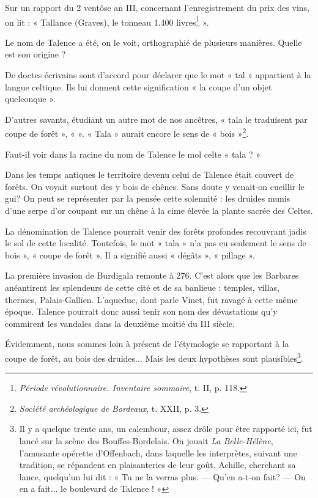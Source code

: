 Sur un rapport du 2 ventôse an III, concernant l'enregistrement du prix des vins, on lit : « Tallance (Graves), le tonneau 1.400 livres\footnote{\textit{Période révolutionnaire. Inventaire sommaire}, t. II, p. 118.} ».

Le nom de Talence a été, on le voit, orthographié de plusieurs manières. Quelle est son origine ?

De doctes écrivains sont d'accord pour déclarer que le mot « tal » appartient à la langue celtique. Ils lui donnent cette signification « la coupe d'un objet quelconque ».

D'autres savants, étudiant un autre mot de nos ancêtres, « tala le traduisent par coupe de forêt », « ». « Tala » aurait encore le sens de « bois »\footnote{\textit{Société archéologique de Bordeaux}, t. XXII, p. 3.}.

Faut-il voir dans la racine du nom de Talence le mol celte « tala ? »

Dans les temps antiques le territoire devenu celui de Talence était couvert de forêts. On voyait surtout des y bois de chênes. Sans doute y venait-on cueillir le gui? On peut se représenter par la pensée cette solennité : les druides munis d'une serpe d'or coupant sur un chêne à la cime élevée la plante sacrée des Celtes.

La dénomination de Talence pourrait venir des forêts profondes recouvrant jadis le sol de cette localité. Toutefois, le mot « tala » n'a pas eu seulement le sens de bois », « coupe de forêt ». Il a signifié aussi « dégâts », « pillage ». 

La première invasion de Burdigala remonte à 276. C'est alors que les Barbares anéantirent les splendeurs de cette cité et de sa banlieue : temples, villas, thermes, Palais-Gallien. L'aqueduc, dont parle Vinet, fut ravagé à cette même époque. Talence pourrait donc aussi tenir son nom des dévastations qu'y commirent les vandales dans la deuxième moitié du III\ieme{} siècle.

Évidemment, nous sommes loin à présent de l'étymologie se rapportant à la coupe de forêt, au bois des druides... Mais les deux hypothèses sont plausibles\footnote{Il y a quelque trente ans, un calembour, assez drôle pour être rapporté ici, fut lancé sur la scène des Bouffes-Bordelais. On jouait \textit{La Belle-Hélène}, l'amusante opérette d'Offenbach, dans laquelle les interprètes, suivant une tradition, se répandent en plaisanteries de leur goût. Achille, cherchant sa lance, quelqu'un lui dit : « Tu ne la verras plus. — Qu'en a-t-on fait? — On en a fait... le boulevard de Talence ! » }.

